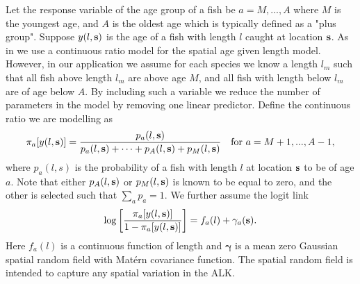 \documentclass[a4paper 12pt]{article}
\numberwithin{equation}{section}
\begin{document}
Let the response variable of the age group of a fish be $a = M,...,A$ where $M$ is the youngest age, and $A$ is the oldest age which is typically defined as a "plus group". Suppose $y(l,{\bf s})$ is the age  of a fish with length $l$ caught at location ${\bf s}$. As in \citet{berg2012spatial} we use a continuous ratio model for the spatial age given length model. However, in our application we assume for each species we know a length $l_m$ such that all fish above length $l_m$ are above age $M$, and all fish with length below $l_m$ are of age below $A$. By including such a variable we reduce the number of parameters in the model by removing one linear predictor. Define the continuous ratio we are modelling as
\begin{equation}\label{eq:linearPred1}
\pi_a[y(l,{\bf s})] = \frac{p_a(l,{\bf s})}{p_a(l,{\bf s}) + \cdots + p_{A}(l,{\bf s}) +p_{M}(l,{\bf s}) } \vspace{ 4mm} \ \ \ \text{for } a =M+1,...,A-1 ,
\end{equation}
where \vspace{-5mm} $p_a(l,s)$ is the probability of a fish with length $l$ at location ${\bf s}$ to be of age $a$. Note that either $p_{A}(l,{\bf s})$ or $p_{M}(l,{\bf s})$ is known to be equal to zero, and the other is selected such that $\sum_a p_a = 1$. We further assume the logit link
\begin{equation}\label{eq:linearPred}
\log \left[ \frac{\pi_a[y(l,{\bf s})]}{1-\pi_a[y(l,{\bf s})]}\right] = f_a(l) + \gamma_a({\bf s}).
\end{equation}
Here $ f_a(l)$ is a continuous function of length and $\pmb{\gamma}$ is a mean zero Gaussian spatial random field with Mat\'{e}rn covariance function. The spatial random field is intended to capture any spatial variation in the ALK.
\end{document}
